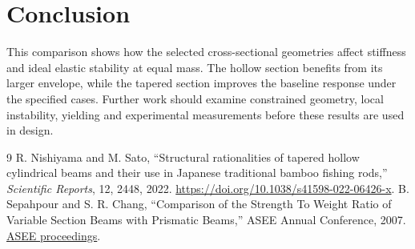 \documentclass[11pt]{article}
\begin{document}
\section{Conclusion}
This comparison shows how the selected cross-sectional geometries affect stiffness and ideal elastic stability at equal mass. The hollow section benefits from its larger envelope, while the tapered section improves the baseline response under the specified cases. Further work should examine constrained geometry, local instability, yielding and experimental measurements before these results are used in design.

\begin{thebibliography}{9}
 R. Nishiyama and M. Sato, ``Structural rationalities of tapered hollow cylindrical beams and their use in Japanese traditional bamboo fishing rods,'' \emph{Scientific Reports}, 12, 2448, 2022. \url{https://doi.org/10.1038/s41598-022-06426-x}.
 B. Sepahpour and S. R. Chang, ``Comparison of the Strength To Weight Ratio of Variable Section Beams with Prismatic Beams,'' ASEE Annual Conference, 2007. \href{https://peer.asee.org/comparison-of-the-strength-to-weight-ratio-of-variable-section-beams-with-prismatic-beams}{ASEE proceedings}.
\end{thebibliography}
\end{document}
